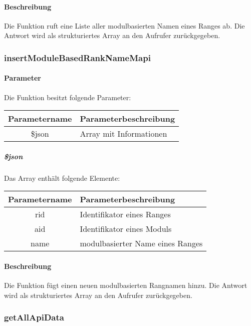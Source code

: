 \paragraph{Beschreibung} Die Funktion ruft eine Liste aller modulbasierten Namen eines Ranges ab. Die Antwort wird als strukturiertes Array an den Aufrufer zurückgegeben.
\subsubsection{insertModuleBasedRankNameMapi}
\paragraph{Parameter} Die Funktion besitzt folgende Parameter:
\begin{table}[H]
	\begin{tabular}{|c|p{11cm}|}
		\hline
		\textbf{Parametername} & \textbf{Parameterbeschreibung} \\ \hline
		\$json & Array mit Informationen \\ \hline
	\end{tabular}
\end{table}
\subparagraph{\$json}Das Array enthält folgende Elemente:
\begin{table}[H]
	\begin{tabular}{|c|p{11cm}|}
		\hline
		\textbf{Parametername} & \textbf{Parameterbeschreibung} \\ \hline
		rid    & Identifikator eines Ranges \\ \hline
		aid    & Identifikator eines Moduls \\ \hline
		name   & modulbasierter Name eines Ranges \\ \hline
	\end{tabular}
\end{table}
\paragraph{Beschreibung} Die Funktion fügt einen neuen modulbasierten Rangnamen hinzu. Die Antwort wird als strukturiertes Array an den Aufrufer zurückgegeben.
\subsubsection{getAllApiData}
